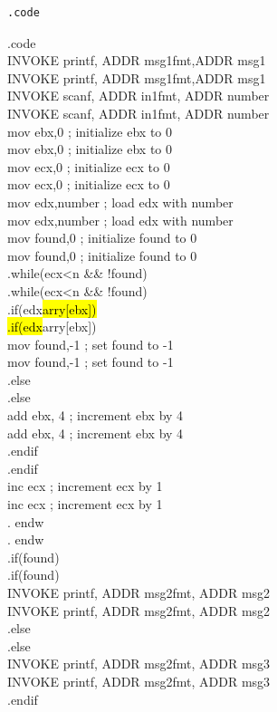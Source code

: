 \documentclass[10pt]{article}
\begin{document}
\begin{verbatim}
.code
\end{verbatim}

.code\\
INVOKE printf, ADDR msg1fmt,ADDR msg1\\
INVOKE printf, ADDR msg1fmt,ADDR msg1\\
INVOKE scanf, ADDR in1fmt, ADDR number\\
INVOKE scanf, ADDR in1fmt, ADDR number\\
mov ebx,0 ; initialize ebx to 0\\
mov ebx,0 ; initialize ebx to 0\\
mov ecx,0 ; initialize ecx to 0\\
mov ecx,0 ; initialize ecx to 0\\
mov edx,number ; load edx with number\\
mov edx,number ; load edx with number\\
mov found,0 ; initialize found to 0\\
mov found,0 ; initialize found to 0\\
.while(ecx<n \&\& !found)\\
.while(ecx<n \&\& !found)\\
.if(edx\hl{arry[ebx])\\
.if(edx}arry[ebx])\\
mov found,-1 ; set found to -1\\
mov found,-1 ; set found to -1\\
.else\\
.else\\
add ebx, 4 ; increment ebx by 4\\
add ebx, 4 ; increment ebx by 4\\
.endif\\
.endif\\
inc ecx ; increment ecx by 1\\
inc ecx ; increment ecx by 1\\
. endw\\
. endw\\
.if(found)\\
.if(found)\\
INVOKE printf, ADDR msg2fmt, ADDR msg2\\
INVOKE printf, ADDR msg2fmt, ADDR msg2\\
.else\\
.else\\
INVOKE printf, ADDR msg2fmt, ADDR msg3\\
INVOKE printf, ADDR msg2fmt, ADDR msg3\\
.endif
\end{document}
